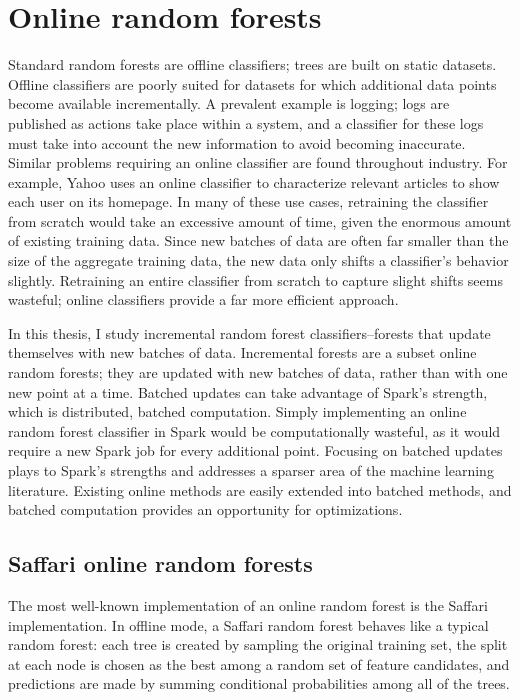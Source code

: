 \section{Online random forests} Standard random forests are offline
classifiers; trees are built on static datasets. Offline classifiers are poorly
suited for datasets for which additional data points become available
incrementally. A prevalent example is logging; logs are published as actions
take place within a system, and a classifier for these logs must take into
account the new information to avoid becoming inaccurate. Similar problems
requiring an online classifier are found throughout industry. For example,
Yahoo uses an online classifier to characterize relevant articles to show each
user on its homepage. In many of these use cases, retraining the classifier
from scratch would take an excessive amount of time, given the enormous amount
of existing training data. Since new batches of data are often far smaller than
the size of the aggregate training data, the new data only shifts a
classifier's behavior slightly. Retraining an entire classifier from scratch to
capture slight shifts seems wasteful; online classifiers provide a far more
efficient approach.

In this thesis, I study incremental random forest classifiers--forests that
update themselves with new batches of data. Incremental forests are a subset
online random forests; they are updated with new batches of data, rather than
with one new point at a time. Batched updates can take advantage of Spark's
strength, which is distributed, batched computation. Simply implementing an
online random forest classifier in Spark would be computationally wasteful, as
it would require a new Spark job for every additional point. Focusing on
batched updates plays to Spark's strengths and addresses a sparser area of the
machine learning literature. Existing online methods are easily extended into
batched methods, and batched computation provides an opportunity for
optimizations.

\subsection{Saffari online random forests} The most well-known implementation
of an online random forest is the Saffari implementation. \cite{Saffari} In
offline mode, a Saffari random forest behaves like a typical random forest:
each tree is created by sampling the original training set, the split at each
node is chosen as the best among a random set of feature candidates, and
predictions are made by summing conditional probabilities among all of the
trees.

